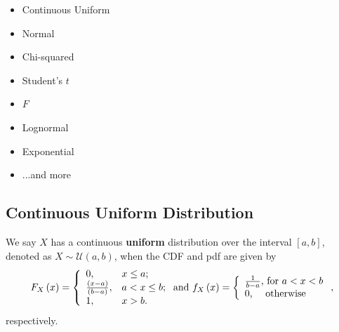 \documentclass[notes=show,smaller,handout]{beamer}\usepackage[]{graphicx}\usepackage[]{color}
\begin{document}
\begin{frame}{\secname}

\begin{itemize}
  \item Continuous Uniform
  \item Normal
  \item Chi-squared
  \item Student's $t$
  \item $F$
  \item Lognormal
  \item Exponential
  \item ...and more
  \end{itemize}
\end{frame}%

\subsection{Continuous Uniform Distribution}

\begin{frame}{\subsecname}

\begin{definition}
We say $X$ has a continuous \textbf{uniform} distribution over the
interval $[a,b]$, denoted as $X\sim \mathcal{U}(a,b)$, when the CDF and pdf are
given by
$$
{F_X\left( x\right)}=\left\{
                           \begin{array}{ll}
                             0, & \hbox{$x\leq a$;} \\
                             \frac{(x-a)}{(b-a)}, & \hbox{$a<x\leq b$;} \\
                             1, & \hbox{$x>b$.}
                           \end{array}
                         \right.\mbox{\color{black}and}~{f_{X}\left( x\right)} =\left\{
\begin{array}{l}
\frac{1}{b-a}\text{, for }a<x<b \\
0\text{, \quad otherwise}%
\end{array}%
\right. ,
$$
respectively.
\end{definition}
\end{frame}%
\end{document}
